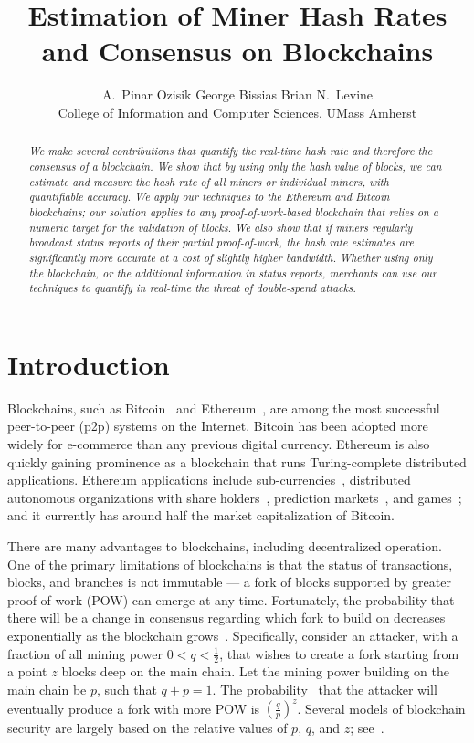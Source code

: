 \documentclass[10pt,sigconf]{acmart}
\title{Estimation of Miner Hash Rates\\ and Consensus on Blockchains}
\author{A.~Pinar Ozisik \hspace{.6cm} George Bissias \hspace{.6cm} Brian N.~Levine\\
College of Information and Computer Sciences, UMass Amherst}
\newcommand{\1}{{\em (i)}}
\newcommand{\2}{{\em (ii)}}
\newcommand{\3}{{\em (iii)}}
\newcommand{\4}{{\em (iv)}}
\newcommand{\5}{{\em (v)}}
\begin{document}
\setlength{\belowdisplayskip}{3pt} 
\setlength{\belowdisplayshortskip}{3pt}
\setlength{\abovedisplayskip}{3pt} 
\setlength{\abovedisplayshortskip}{3pt}

\begin{abstract}
  \em  
We make several contributions that quantify the
  real-time hash rate and therefore the consensus of a blockchain. We
  show that by using only the hash value of blocks, we can estimate
  and measure the hash rate of all miners or individual miners, with
  quantifiable accuracy. We apply our techniques to the Ethereum and
  Bitcoin blockchains;  our solution applies to any proof-of-work-based
  blockchain that relies on a numeric {\em target} for the validation
  of blocks.  We also show that if miners regularly broadcast status
  reports of their partial proof-of-work, the hash rate estimates are
  significantly more accurate at a cost of slightly higher bandwidth. Whether
  using only the blockchain, or
  the additional information in status reports, merchants can use our
  techniques to quantify in real-time the threat of double-spend
  attacks.
 
 
\end{abstract}

\maketitle
{}
\pagestyle{plain}

\section{Introduction}\label{sec:intro}
Blockchains, such as Bitcoin~\cite{Nakamoto:2009} and
Ethereum~\cite{ethereum}, are among the most successful peer-to-peer
 (p2p) systems on the Internet. Bitcoin has been adopted more widely for
e-commerce than any previous digital currency. Ethereum is also quickly
gaining prominence as a blockchain that runs Turing-complete
distributed applications. Ethereum applications include
sub-currencies~\cite{digix}, distributed autonomous
organizations with share holders~\cite{digixdao},
prediction markets~\cite{Gnosis:2016}, and games~\cite{etheria:2016};
and it currently has around half the market capitalization of Bitcoin.

There are many advantages to blockchains, including decentralized
operation. One of the primary limitations of blockchains is that the
status of transactions, blocks, and branches is not immutable --- a
fork of blocks supported by greater proof of work (POW) can emerge at any
time. Fortunately, the probability that there will be a change in
consensus regarding which fork to build on decreases
exponentially as the blockchain
grows~\cite{Nakamoto:2009}. Specifically, consider an attacker, with a
fraction of all mining power $0<q<\frac12$, that wishes to create a
fork starting from a point $z$ blocks deep on the main chain. Let the
mining power building on the main chain be $p$, such that $q+p=1$. The
probability~\cite{Feller:1968} that the attacker will eventually
produce a fork with more POW is ${(\frac{q}{p})}^z$. Several
models of blockchain security are largely based on the relative values
of $p$, $q$, and $z$; see~\cite{Garay:2015,eyal:2014}.
\end{document}
